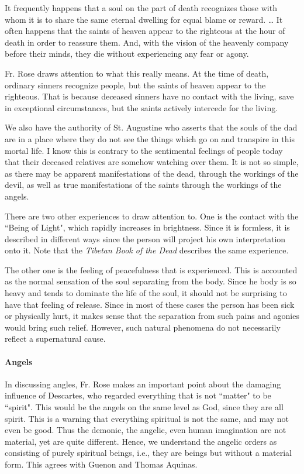 \begin{quotex}
It frequently happens that a soul on the part of death recognizes those with whom it is to share the same eternal dwelling for equal blame or reward. … It often happens that the saints of heaven appear to the righteous at the hour of death in order to reassure them. And, with the vision of the heavenly company before their minds, they die without experiencing any fear or agony. 

\end{quotex}
Fr. Rose draws attention to what this really means. At the time of death, ordinary sinners recognize people, but the saints of heaven appear to the righteous. That is because deceased sinners have no contact with the living, save in exceptional circumstances, but the saints actively intercede for the living.

We also have the authority of St. Augustine who asserts that the souls of the dad are in a place where they do not see the things which go on and transpire in this mortal life. I know this is contrary to the sentimental feelings of people today that their deceased relatives are somehow watching over them. It is not so simple, as there may be apparent manifestations of the dead, through the workings of the devil, as well as true manifestations of the saints through the workings of the angels.

There are two other experiences to draw attention to. One is the contact with the ``Being of Light", which rapidly increases in brightness. Since it is formless, it is described in different ways since the person will project his own interpretation onto it. Note that the \textit{Tibetan Book of the Dead} describes the same experience.

The other one is the feeling of peacefulness that is experienced. This is accounted as the normal sensation of the soul separating from the body. Since he body is so heavy and tends to dominate the life of the soul, it should not be surprising to have that feeling of release. Since in most of these cases the person has been sick or physically hurt, it makes sense that the separation from such pains and agonies would bring such relief. However, such natural phenomena do not necessarily reflect a supernatural cause.

\paragraph{Angels}
In discussing angles, Fr. Rose makes an important point about the damaging influence of Descartes, who regarded everything that is not ``matter" to be ``spirit". This would be the angels on the same level as God, since they are all spirit. This is a warning that everything spiritual is not the same, and may not even be good. Thus the demonic, the angelic, even human imagination are not material, yet are quite different. Hence, we understand the angelic orders as consisting of purely spiritual beings, i.e., they are beings but without a material form. This agrees with Guenon and Thomas Aquinas.


